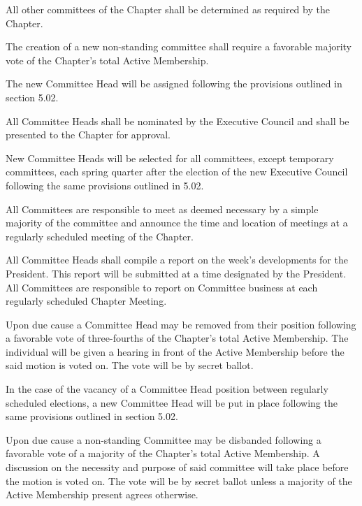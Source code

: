 \documentclass[11pt]{article}
\begin{document}
\begin{legal}
\begin{legal}
      \item 
        All other committees of the Chapter shall be determined as required by the Chapter.
        \begin{legal}
          \item 
            The creation of a new non-standing committee shall require a favorable majority vote of the Chapter’s total Active Membership.
          \item 
            The new Committee Head will be assigned following the provisions outlined in section 5.02.
        \end{legal}
    \end{legal}
  \item
    All Committee Heads shall be nominated by the Executive Council and shall be presented to the Chapter for approval.
  \item
    New Committee Heads will be selected for all committees, except temporary committees, each spring quarter after the election of the new Executive Council following the same provisions outlined in 5.02.
  \item
    All Committees are responsible to meet as deemed necessary by a simple majority of the committee and announce the time and location of meetings at a regularly scheduled meeting of the Chapter.
  \item
    All Committee Heads shall compile a report on the week’s developments for the President.
    This report will be submitted at a time designated by the President.
    All Committees are responsible to report on Committee business at each regularly scheduled Chapter Meeting.
  \item
    Upon due cause a Committee Head may be removed from their position following a favorable vote of three-fourths of the Chapter’s total Active Membership.
    The individual will be given a hearing in front of the Active Membership before the said motion is voted on.
    The vote will be by secret ballot.
  \item
    In the case of the vacancy of a Committee Head position between regularly scheduled elections, a new Committee Head will be put in place following the same provisions outlined in section 5.02.
  \item
    Upon due cause a non-standing Committee may be disbanded following a favorable vote of a majority of the Chapter’s total Active Membership.
    A discussion on the necessity and purpose of said committee will take place before the motion is voted on.
    The vote will be by secret ballot unless a majority of the Active Membership present agrees otherwise.
\end{legal}
\end{document}
